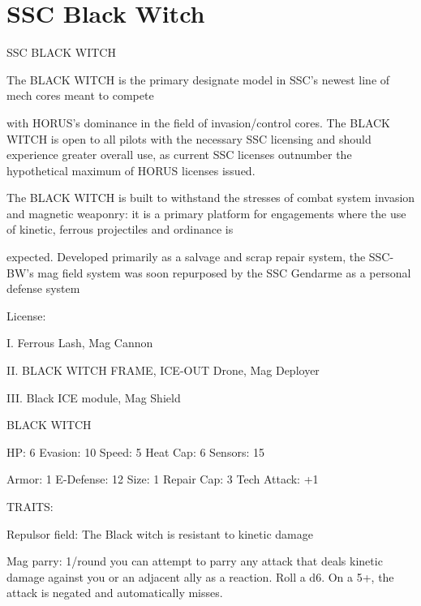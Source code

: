 \section{SSC Black Witch}

                                                               
                                            SSC BLACK WITCH  

The BLACK WITCH is the primary designate model in SSC’s newest line of mech cores meant to compete  

with HORUS’s dominance in the field of invasion/control cores. The BLACK WITCH is open to all pilots with  
the necessary SSC licensing and should experience greater overall use, as current SSC licenses outnumber  
the hypothetical maximum of HORUS licenses issued.   

The BLACK WITCH is built to withstand the stresses of combat system invasion and magnetic weaponry: it  
is a primary platform for engagements where the use of kinetic, ferrous projectiles and ordinance is  

expected. Developed primarily as a salvage and scrap repair system, the SSC-BW’s mag field system was  
soon repurposed by the SSC Gendarme as a personal defense system    

                                                                                                                       


                                                  License:
 
I. Ferrous Lash, Mag Cannon
 
II. BLACK WITCH FRAME, ICE-OUT Drone, Mag Deployer
 
III. Black ICE module, Mag Shield
 

                                             BLACK WITCH 

 HP: 6          Evasion: 10                          Speed: 5           Heat Cap: 6        Sensors: 15 

 Armor: 1       E-Defense: 12                        Size: 1            Repair Cap: 3      Tech Attack:  
                                                                                           +1 

                                                  TRAITS: 

 Repulsor field: The Black witch is resistant to kinetic damage
 
 Mag parry: 1/round you can attempt to parry any attack that deals kinetic damage against you or an  
 adjacent ally as a reaction. Roll a d6. On a 5+, the attack is negated and automatically misses. 

